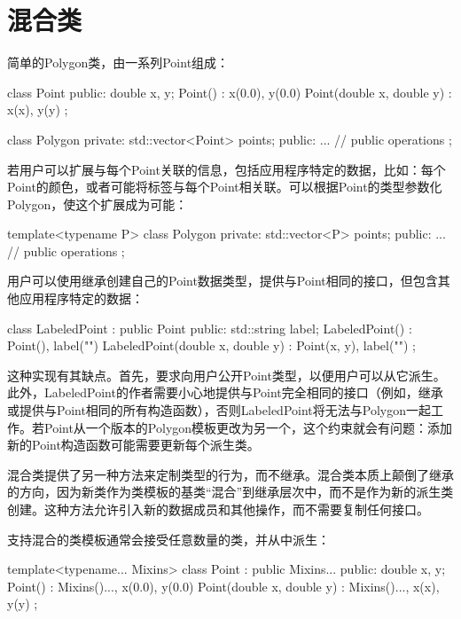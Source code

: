\section{混合类}

简单的Polygon类，由一系列Point组成：

\begin{cpp}
class Point {
	public:
	double x, y;
	Point() : x(0.0), y(0.0) { }
	Point(double x, double y) : x(x), y(y) { }
};

class Polygon {
	private:
	std::vector<Point> points;
	public:
	... // public operations
};
\end{cpp}

若用户可以扩展与每个Point关联的信息，包括应用程序特定的数据，比如：每个Point的颜色，或者可能将标签与每个Point相关联。可以根据Point的类型参数化Polygon，使这个扩展成为可能：

\begin{cpp}
template<typename P>
class Polygon {
	private:
	std::vector<P> points;
	public:
	... // public operations
};
\end{cpp}

用户可以使用继承创建自己的Point数据类型，提供与Point相同的接口，但包含其他应用程序特定的数据：

\begin{cpp}
class LabeledPoint : public Point {
	public:
	std::string label;
	LabeledPoint() : Point(), label("") { }
	LabeledPoint(double x, double y) : Point(x, y), label("") { }
};
\end{cpp}

这种实现有其缺点。首先，要求向用户公开Point类型，以便用户可以从它派生。此外，LabeledPoint的作者需要小心地提供与Point完全相同的接口（例如，继承或提供与Point相同的所有构造函数），否则LabeledPoint将无法与Polygon一起工作。若Point从一个版本的Polygon模板更改为另一个，这个约束就会有问题：添加新的Point构造函数可能需要更新每个派生类。

混合类提供了另一种方法来定制类型的行为，而不继承。混合类本质上颠倒了继承的方向，因为新类作为类模板的基类“混合”到继承层次中，而不是作为新的派生类创建。这种方法允许引入新的数据成员和其他操作，而不需要复制任何接口。

支持混合的类模板通常会接受任意数量的类，并从中派生：

\begin{cpp}
template<typename... Mixins>
class Point : public Mixins... {
	public:
	double x, y;
	Point() : Mixins()..., x(0.0), y(0.0) { }
	Point(double x, double y) : Mixins()..., x(x), y(y) { }
};
\end{cpp}

